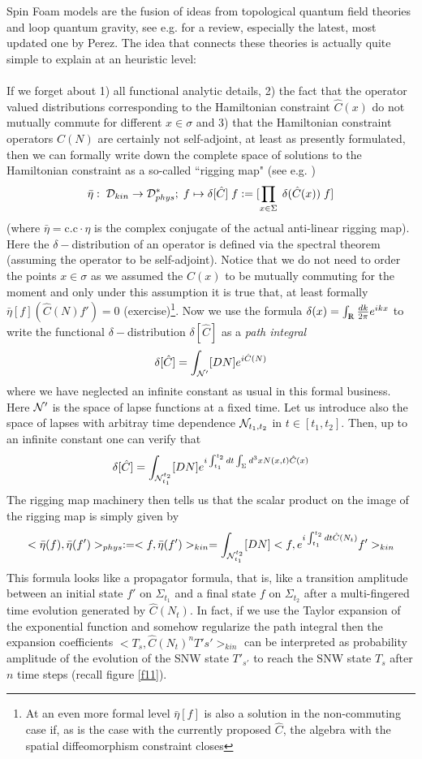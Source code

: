 \documentclass[12pt]{report}
\def\be{\begin{equation}}
\def\ee{\end{equation}}
\def\Rl{{\mathchoice
{\setbox0=\hbox{$\displaystyle\rm R$}\hbox{\hbox to0pt
{\kern0.4\wd0\vrule height0.9\ht0\hss}\box0}}
{\setbox0=\hbox{$\textstyle\rm R$}\hbox{\hbox to0pt
{\kern0.4\wd0\vrule height0.9\ht0\hss}\box0}}
{\setbox0=\hbox{$\scriptstyle\rm R$}\hbox{\hbox to0pt
{\kern0.4\wd0\vrule height0.9\ht0\hss}\box0}}
{\setbox0=\hbox{$\scriptscriptstyle\rm R$}\hbox{\hbox to0pt
{\kern0.4\wd0\vrule height0.9\ht0\hss}\box0}}}}
\begin{document}
Spin Foam models are the fusion of ideas from topological quantum field 
theories and loop quantum gravity, see e.g. \cite{47} for a review, 
especially the latest, most updated one by Perez.
The idea that connects these theories is actually quite simple to explain
at an heuristic level:\\
\\
If we forget about 1) all functional analytic details, 2) the fact 
that the operator valued distributions corresponding to the Hamiltonian
constraint $\hat{C}(x)$ do not mutually commute for different $x\in\sigma$
and 3) that the Hamiltonian constraint operators $\hat{C}(N)$ are 
certainly not self-adjoint, at least as presently formulated, then 
we can formally write down the complete space of solutions to the 
Hamiltonian constraint as a so-called ``rigging map" (see e.g. \cite{0})
\be \label{3.3.1}
\bar{\eta}:\;{\cal D}_{kin}\to {\cal D}_{phys}^\ast;\;
f\mapsto \delta[\hat{C}]\;f:=[\prod_{x\in\Sigma}\;\delta(\hat{C}(x))\;f]
\ee
(where $\bar{\eta}=\mbox{c.c}\cdot\eta$ is the 
complex conjugate of the actual anti-linear rigging map).
Here the $\delta-$distribution of an operator is defined via the spectral
theorem (assuming the operator to be self-adjoint). Notice that we do not 
need to order the points $x\in\sigma$ as we assumed the $\hat{C}(x)$ to be 
mutually commuting for the moment and only under this assumption it is
true that, at least formally $\bar{\eta}[f](\hat{C}(N)f')=0$ 
(exercise)\footnote{At an even more formal level $\bar{\eta}[f]$
is also a solution in the non-commuting case if, as is the case with the 
currently proposed $\hat{C}$, the algebra with the spatial diffeomorphism 
constraint closes}.
Now we use the formula $\delta(x)=\int_\Rl \frac{dk}{2\pi} e^{ikx}$
to write the functional $\delta-$distribution $\delta[\hat{C}]$ as
a {\it path integral}
\be \label{3.3.2}
\delta[\hat{C}]=
\int_{{\cal N}'} [DN] e^{i\hat{C}(N)}
\ee
where we have neglected an infinite constant as usual in this formal
business. Here ${\cal N}'$ is the space of lapse functions at a fixed 
time. Let us introduce also the space of lapses with arbitray time 
dependence ${\cal N}_{t_1,t_2}$ in $t\in [t_1,t_2]$. Then, up to an 
infinite constant one can verify that
\be \label{3.3.2a}
\delta[\hat{C}]=
\int_{{\cal N}_{t_1}^{t_2}} [DN] 
e^{i\int_{t_1}^{t_2} dt \int_\Sigma d^3x N(x,t) \hat{C}(x)}
\ee
The rigging map machinery then tells us that the scalar product 
on the image of the rigging map is simply given by
\be \label{3.3.3}
<\bar{\eta}(f),\bar{\eta}(f')>_{phys}:=<f,\bar{\eta}(f')>_{kin}
=\int_{{\cal N}_{t_1}^{t_2}} [DN] <f,e^{i\int_{t_1}^{t_2} dt \hat{C}(N_t)} 
f'>_{kin}
\ee
This formula looks like a propagator formula, that is, like a transition 
amplitude between an initial state $f'$ on $\Sigma_{t_1}$ and a final 
state $f$ on $\Sigma_{t_2}$ after 
a multi-fingered time evolution generated by $\hat{C}(N_t)$.
In fact, if we use the Taylor expansion of the exponential function
and somehow regularize the path integral then the expansion coefficients
$<T_s,\hat{C}(N_t)^n T'{s'}>_{kin}$ can be interpreted as probability 
amplitude of the evolution of the SNW state $T'_{s'}$ to reach the SNW
state $T_s$ after $n$ time steps (recall figure \ref{f11}). 
\end{document}
